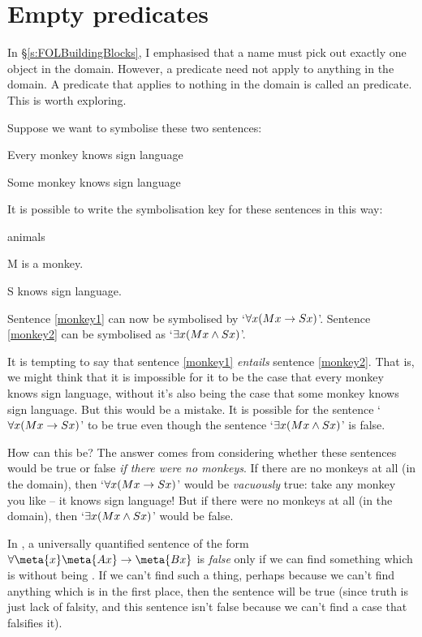 \section{Empty predicates}
In §\ref{s:FOLBuildingBlocks}, I emphasised that a name must pick out exactly one object in the domain. However, a predicate need not apply to anything in the domain. A predicate that applies to nothing in the domain is called an  predicate. This is worth exploring.

Suppose we want to symbolise these two sentences:
	\begin{earg}
		\item[\ex{monkey1}] Every monkey knows sign language
		\item[\ex{monkey2}] Some monkey knows sign language
	\end{earg}
It is possible to write the symbolisation key for these sentences in this way:
	\begin{ekey}
		\item[\text{domain}] animals
		\item[M]  is a monkey.
		\item[S]  knows sign language.
	\end{ekey}
Sentence \ref{monkey1} can now be symbolised by `$\forall x(Mx \rightarrow Sx)$'. Sentence \ref{monkey2} can be symbolised as `$\exists x(Mx \wedge Sx)$'.

It is tempting to say that sentence \ref{monkey1} \emph{entails} sentence \ref{monkey2}. That is, we might think that it is impossible for it to be the case that every monkey knows sign language, without it's also being the case that some monkey knows sign language.  But this would be a mistake. It is possible for the sentence `$\forall x(Mx \rightarrow Sx)$' to be true even though the sentence `$\exists x(Mx \wedge Sx)$' is false.

How can this be? The answer comes from considering whether these sentences would be true or false \emph{if there were no monkeys}. If there are no monkeys at all (in the domain), then `$\forall x(Mx \rightarrow Sx)$' would be \emph{vacuously} true: take any monkey you like – it knows sign language! But if there were no monkeys at all (in the domain), then `$\exists x(Mx \wedge Sx)$' would be false.

In \FOL, a universally quantified sentence of the form $\forall \meta{x} \meta{Ax} \eif \meta{Bx}$ is \emph{false} only if we can find something which is  without being . If we can't find such a thing, perhaps because we can't find anything which is  in the first place, then the sentence will be true (since truth is just lack of falsity, and this sentence isn't false because we can't find a case that falsifies it). 

